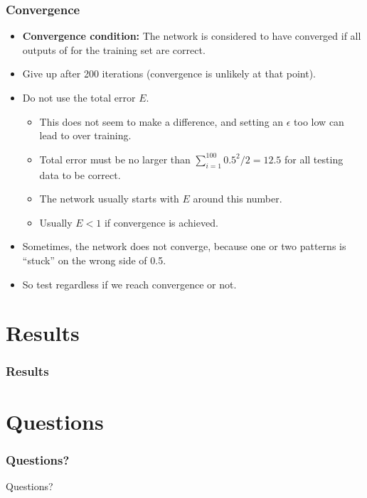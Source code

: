 \documentclass{beamer}
\numberwithin{equation}{section} %
\begin{document}
\begin{frame}
    \frametitle{Convergence}
    \begin{itemize}
        \item \textbf{Convergence condition: } The network is considered to have converged if all outputs of for the training set are correct.
        \pause
        \item Give up after 200 iterations (convergence is unlikely at that point).
        \pause
        \item Do not use the total error $E$.
        \pause
        \begin{itemize}
            \item This does not seem to make a difference, and setting an $\epsilon$ too low can lead to over training.
            \pause
            \item Total error must be no larger than $\sum_{i=1}^{100}{0.5^2}/2=12.5$ for all testing data to be correct.
            \pause
            \item The network usually starts with $E$ around this number.
            \pause
            \item Usually $E < 1$ if convergence is achieved.
        \end{itemize}
        \pause
        \item Sometimes, the network does not converge, because one or two patterns is ``stuck'' on the wrong side of 0.5.
        \pause
        \item So test regardless if we reach convergence or not.
    \end{itemize}
\end{frame}

\section{Results}

\begin{frame}
    \frametitle{Results}
\end{frame}

\section{Questions}

\begin{frame}
    \frametitle{Questions?}
    \huge{Questions?}
\end{frame}
\end{document}
